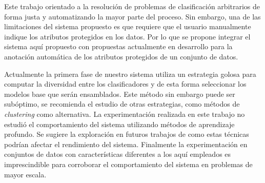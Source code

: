 \begin{recomendations}

Este trabajo orientado a la resolución de problemas de clasificación arbitrarios de forma justa y automatizando la mayor parte del proceso.
Sin embargo, una de las limitaciones del sistema propuesto es que requiere que el usuario manualmente indique los atributos protegidos en los datos.
Por lo que se propone integrar el sistema aquí propuesto con propuestas actualmente en desarrollo para la anotación automática de los atributos protegidos de un conjunto de datos.

Actualmente la primera fase de nuestro sistema utiliza un estrategia golosa para computar la diversidad entre los clasificadores y de esta forma seleccionar los modelos base que serán ensamblados.
Este método sin embargo puede ser subóptimo, se recomienda el estudio de otras estrategias, como métodos de \emph{clustering} como alternativa.
La experimentación realizada en este trabajo no estudió el comportamiento del sistema utilizando métodos de aprendizaje profundo.
Se sugiere la exploración en futuros trabajos de como estas técnicas podrían afectar el rendimiento del sistema.
Finalmente la experimentación en conjuntos de datos con características diferentes a los aquí empleados es imprescindible para corroborar el comportamiento del sistema en problemas de mayor escala.

\end{recomendations}
